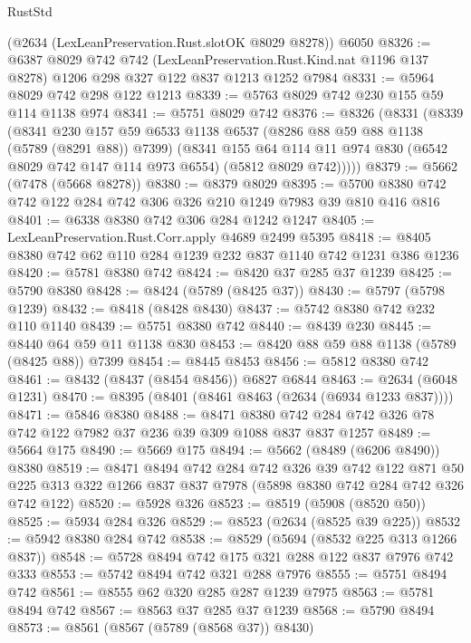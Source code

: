 \begin{lexlean}{RustStd}
\begin{coremodule}
    (@2634 (LexLeanPreservation.Rust.slotOK @8029 @8278))
    @6050
@8326 := @6387
    @8029
    @742
    @742
    (LexLeanPreservation.Rust.Kind.nat @1196 @137 @8278)
    @1206
    @298
    @327
    @122
    @837
    @1213
    @1252
    @7984
@8331 := @5964 @8029 @742 @298 @122 @1213
@8339 := @5763 @8029 @742 @230 @155 @59 @114 @1138 @974
@8341 := @5751 @8029 @742
@8376 := @8326
    (@8331
      (@8339
        (@8341
          @230
          @157
          @59
          @6533
          @1138
          @6537
          (@8286 @88 @59 @88 @1138 (@5789 (@8291 @88)) @7399)
          (@8341
            @155
            @64
            @114
            @11
            @974
            @830
            (@6542 @8029 @742 @147 @114 @973 @6554)
            (@5812 @8029 @742)))))
@8379 := @5662 (@7478 (@5668 @8278))
@8380 := @8379 @8029
@8395 := @5700 @8380 @742 @742 @122 @284 @742 @306 @326 @210 @1249 @7983 @39 @810 @416 @816
@8401 := @6338 @8380 @742 @306 @284 @1242 @1247
@8405 := LexLeanPreservation.Rust.Corr.apply @4689 @2499 @5395
@8418 := @8405 @8380 @742 @62 @110 @284 @1239 @232 @837 @1140 @742 @1231 @386 @1236
@8420 := @5781 @8380 @742
@8424 := @8420 @37 @285 @37 @1239
@8425 := @5790 @8380
@8428 := @8424 (@5789 (@8425 @37))
@8430 := @5797 (@5798 @1239)
@8432 := @8418 (@8428 @8430)
@8437 := @5742 @8380 @742 @232 @110 @1140
@8439 := @5751 @8380 @742
@8440 := @8439 @230
@8445 := @8440 @64 @59 @11 @1138 @830
@8453 := @8420 @88 @59 @88 @1138 (@5789 (@8425 @88)) @7399
@8454 := @8445 @8453
@8456 := @5812 @8380 @742
@8461 := @8432 (@8437 (@8454 @8456)) @6827 @6844
@8463 := @2634 (@6048 @1231)
@8470 := @8395 (@8401 (@8461 @8463 (@2634 (@6934 @1233 @837))))
@8471 := @5846 @8380
@8488 := @8471 @8380 @742 @284 @742 @326 @78 @742 @122 @7982 @37 @236 @39 @309 @1088 @837 @837 @1257
@8489 := @5664 @175
@8490 := @5669 @175
@8494 := @5662 (@8489 (@6206 @8490)) @8380
@8519 := @8471
    @8494
    @742
    @284
    @742
    @326
    @39
    @742
    @122
    @871
    @50
    @225
    @313
    @322
    @1266
    @837
    @837
    @7978
    (@5898 @8380 @742 @284 @742 @326 @742 @122)
@8520 := @5928 @326
@8523 := @8519 (@5908 (@8520 @50))
@8525 := @5934 @284 @326
@8529 := @8523 (@2634 (@8525 @39 @225))
@8532 := @5942 @8380 @284 @742
@8538 := @8529 (@5694 (@8532 @225 @313 @1266 @837))
@8548 := @5728 @8494 @742 @175 @321 @288 @122 @837 @7976 @742 @333
@8553 := @5742 @8494 @742 @321 @288 @7976
@8555 := @5751 @8494 @742
@8561 := @8555 @62 @320 @285 @287 @1239 @7975
@8563 := @5781 @8494 @742
@8567 := @8563 @37 @285 @37 @1239
@8568 := @5790 @8494
@8573 := @8561 (@8567 (@5789 (@8568 @37)) @8430)

\end{coremodule}
\end{lexlean}
